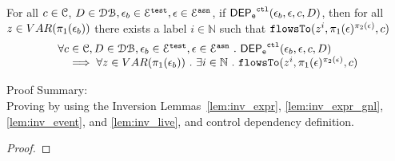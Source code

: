 %
\begin{lem}
	\label{lem:ctldep_inv}
	For all $c \in \mathcal{C}$, $D \in \mathcal{DB}, \mathtt{\epsilon}_b \in \mathcal{E}^{\mathtt{{test}}}, \mathtt{\epsilon} \in \mathcal{E}^{\mathtt{{asn}}} $, if 
	$\mathsf{DEP_{\mathtt{e}}}^{\mathtt{{ctl}}}(\mathtt{\epsilon}_b, \mathtt{\epsilon}, c, D)$, 
	then for all  $z \in VAR(\pi_1(\mathtt{\epsilon}_b))$ there exists a label $i \in \mathbb{N}$ such that 
	$\mathtt{flowsTo}(z^i, \pi_1(\mathtt{\epsilon})^{\pi_2(\mathtt{\epsilon})}, c)$
	\[		
		\begin{array}{l}
			\forall c \in \mathcal{C}, D \in \mathcal{DB}, \mathtt{\epsilon}_b \in \mathcal{E}^{\mathtt{{test}}}, \mathtt{\epsilon} \in \mathcal{E}^{\mathtt{{asn}}} ~.~ 
			\mathsf{DEP_{\mathtt{e}}}^{\mathtt{{ctl}}}(\mathtt{\epsilon}_b, \mathtt{\epsilon}, c, D) 
			\\ \quad 
			\implies
			\forall z \in VAR(\pi_1(\mathtt{\epsilon}_b)) ~.~ \exists i \in \mathbb{N} ~.~
			\mathtt{flowsTo}(z^i, \pi_1(\mathtt{\epsilon})^{\pi_2(\mathtt{\epsilon})}, c)
	\end{array}
	\]
	\end{lem}
	Proof Summary:
	\\
	Proving by using the Inversion Lemmas~\ref{lem:inv_expr}, \ref{lem:inv_expr_gnl}, 
	\ref{lem:inv_event}, and \ref{lem:inv_live}, and control dependency definition.
%
	\begin{proof}
	\end{proof}

